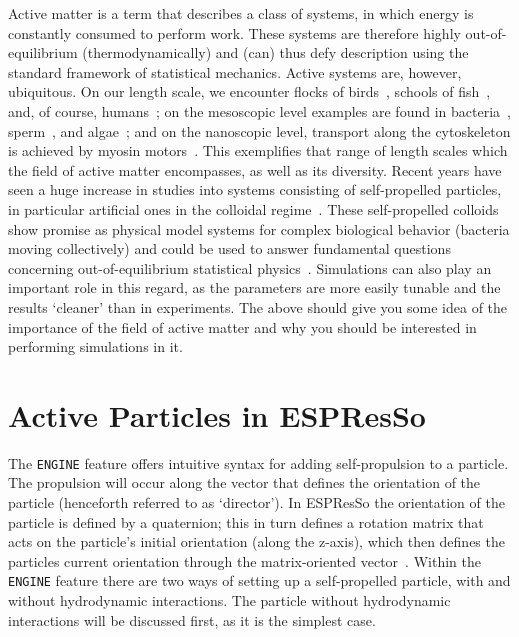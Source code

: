 \documentclass[aip,jcp,reprint,a4paper,onecolumn,amsmath]{revtex4-1}
\newcommand\code{\lstinline}
\newcommand{\es}{\mbox{\textsf{ESPResSo}}\xspace}
\begin{document}
Active matter is a term that describes a class of systems, in which energy is
constantly consumed to perform work. These systems are therefore highly
out-of-equilibrium (thermodynamically) and (can) thus defy description using
the standard framework of statistical mechanics. Active systems are, however,
ubiquitous. On our length scale, we encounter flocks of
birds~\cite{Ballerini_08}, schools of fish~\cite{Katz_11}, and, of course,
humans~\cite{Helbing_00,Zhang_13,Sliverberg_13}; on the mesoscopic level
examples are found in bacteria~\cite{Sokolov_07,Schwarz-Linek_12,Reufer_14},
sperm~\cite{Woolley_03,Riedel_05,Ma_14}, and algae~\cite{Polin_09,Geyer_13};
and on the nanoscopic level, transport along the cytoskeleton is achieved by
myosin motors~\cite{Mizuno07}. This exemplifies that range of length scales
which the field of active matter encompasses, as well as its diversity. Recent
years have seen a huge increase in studies into systems consisting of
self-propelled particles, in particular artificial ones in the colloidal
regime~\cite{ismagilov,Paxton_04,Wang_06,Brown,Ebbens,Ebbens_12,Howse_07,Valadares_10,simmchen,Yoshinaga,Baraban_13a,Buttinoni_12,Solovev_09,Mei_11}.
These self-propelled colloids show promise as physical model systems for
complex biological behavior (bacteria moving collectively) and could be used to
answer fundamental questions concerning out-of-equilibrium statistical
physics~\cite{Cates_12,Cates_14}. Simulations can also play an important role
in this regard, as the parameters are more easily tunable and the results
`cleaner' than in experiments. The above should give you some idea of the
importance of the field of active matter and why you should be interested in
performing simulations in it.

\section{\label{sec:swimming}Active Particles in ESPResSo }

The \code{ENGINE} feature offers intuitive syntax for adding self-propulsion to
a particle. The propulsion will occur along the vector that defines the
orientation of the particle (henceforth referred to as `director'). In \es{}
the orientation of the particle is defined by a quaternion; this in turn
defines a rotation matrix that acts on the particle's initial orientation
(along the z-axis), which then defines the particles current orientation
through the matrix-oriented vector~\cite{UG,Limbach_06,Arnold_13}. Within the
\code{ENGINE} feature there are two ways of setting up a self-propelled
particle, with and without hydrodynamic interactions. The particle without
hydrodynamic interactions will be discussed first, as it is the simplest case.
\end{document}
